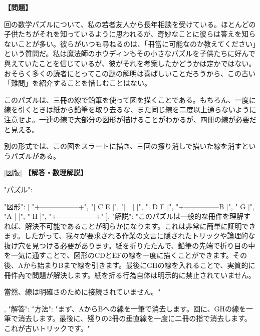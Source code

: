 \documentclass[10pt,a4paper,oneside,openany]{ltjsbook}
\begin{document}
\begin{tcolorbox}[colback=softblue,colframe=primaryblue,title=\textbf{第 239 問：A JUVENILE PUZZLE.},arc=2mm,boxrule=1pt,breakable]
\textbf{【問題】}\par\vspace{0.3em}
回の数学パズルについて、私の若者友人から長年相談を受けている。ほとんどの子供たちがそれを知っているように思われるが、奇妙なことに彼らは答えを知らないことが多い。彼らがいつも尋ねるのは、「冊當に可能なのか教えてください」という質問だ。私は魔法師のホウディンもその小さなパズルを子供たちに好んで與えていたことを信じているが、彼がそれを考案したかどうかは定かではない。おそらく多くの読者にとってこの謎の解明は喜ばしいことだろうから、この古い「難問」を紹介することを惜しむことはない。

このパズルは、三冊の線で鉛筆を使って図を描くことである。もちろん、一度に線を引くときは紙から鉛筆を取り去るな、また同じ線を二度以上通らないように注意せよ。一連の線で大部分の図形が描けることがわかるが、四冊の線が必要だと見える。

別の形式では、この図をスラートに描き、三回の擦り消しで描いた線を消すというパズルがある。

[図版]
\tcblower
\textbf{【解答・数理解説】}\par\vspace{0.3em}
{
    "パズル": {
        "図形": [
            "+-----------------+",
            "|     C     E     |",
            "|     |     |     |",
            "|     D     F     |",
            "+---------------B |",
            "             G    |",
            "A            |    |",
            "              H   |",
            "+-----------------+"
        ],
        "解説": "このパズルは一般的な冊件を理解すれば、解決不可能であることが明らかになります。これは非常に簡単に証明できます。したがって、我々が要求される作業の文言に隠されたトリックや論理的な抜け穴を見つける必要があります。紙を折りたたんで、鉛筆の先端で折り目の中を一気に通すことで、図形のCDとEFの線を一度に描くことができます。その後、Aから始まりBまで線を引きます。最後にGHの線を入れることで、実質的に冊件內で問題が解決します。紙を折る行為自体は明示的に禁止されていません。

當然、線は明確さのために接続されていません。"
    },
    "解答": {
        "方法": "まず、AからBへの線を一筆で消去します。回に、GHの線を一筆で消去します。最後に、殘りの2冊の垂直線を一度に二冊の指で消去します。これが古いトリックです。"
    }
}
\end{tcolorbox}
\end{document}
